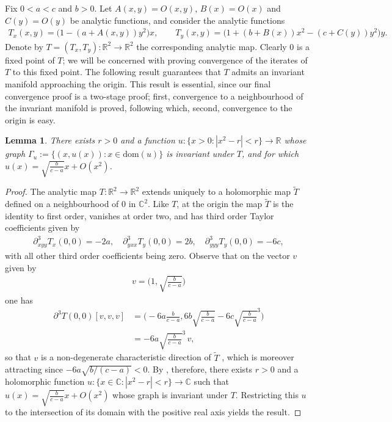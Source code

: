 \documentclass{article}
\newcommand{\RB}{\mathbb{R}}
\newcommand{\CB}{\mathbb{C}}
\theoremstyle{plain}
\newtheorem{lemma}[theorem]{Lemma}
\theoremstyle{definition}
\theoremstyle{remark}
\begin{document}
Fix $0<a<c$ and $b>0$. Let $A(x,y) = O(x,y)$, $B(x) = O(x)$ and $C(y) = O(y)$ be analytic functions, and consider the analytic functions
\begin{align}
    T_x(x,y) = \big(1-(a+A(x,y))y^2\big)x,\qquad T_y(x,y) = \big(1+(b+B(x))x^2-(c+C(y))y^2\big)y. 
\end{align}
Denote by $T = (T_x,T_y):\RB^2\rightarrow\RB^2$ the corresponding analytic map. Clearly $0$ is a fixed point of $T$; we will be concerned with proving convergence of the iterates of $T$ to this fixed point. The following result guarantees that $T$ admits an invariant manifold approaching the origin. This result is essential, since our final convergence proof is a two-stage proof; first, convergence to a neighbourhood of the invariant manifold is proved, following which, second, convergence to the origin is easy.

\begin{lemma}\label{lem:invariant}
    There exists $r>0$ and a function $u:\{x>0:|x^2-r|<r\}\rightarrow\RB$ whose graph $\Gamma_u:=\{(x,u(x)):x\in\text{dom}(u)\}$ is invariant under $T$, and for which $u(x) = \sqrt{\frac{b}{c-a}}x+O(x^2)$.
\end{lemma}

\begin{proof}
    The analytic map $T:\RB^2\rightarrow\RB^2$ extends uniquely to a holomorphic map $\tilde{T}$ defined on a neighbourhood of $0$ in $\CB^2$. Like $T$, at the origin the map $\tilde{T}$ is the identity to first order, vanishes at order two, and has third order Taylor coefficients given by
    \begin{align}
        \partial_{xyy}^3T_x(0,0) = -2a,\quad \partial^3_{yxx}T_y(0,0) = 2b,\quad \partial^3_{yyy}T_y(0,0) = -6c,
    \end{align}
    with all other third order coefficients being zero. Observe that on the vector $v$ given by
    \begin{align}
        v =\bigg(1,\sqrt{\frac{b}{c-a}}\bigg)
    \end{align}
    one has
    \begin{align}
        \partial^3T(0,0)[v,v,v] &= \bigg(-6a\frac{b}{c-a}, 6b\sqrt{\frac{b}{c-a}}-6c\sqrt{\frac{b}{c-a}}^3\bigg)\\&=-6a\sqrt{\frac{b}{c-a}}^3\,v,
    \end{align}
    so that $v$ is a non-degenerate characteristic direction of $\tilde{T}$ \cite[Definition 4.1]{hakimhigher}, which is moreover attracting since $-6a\sqrt{b/(c-a)}<0$. By \cite[Section 6]{hakimhigher}, therefore, there exists $r>0$ and a holomorphic function $u:\{x\in\CB:|x^2-r|<r\}\rightarrow\CB$ such that $u(x) = \sqrt{\frac{b}{c-a}}x+O(x^2)$ whose graph is invariant under $T$. Restricting this $u$ to the intersection of its domain with the positive real axis yields the result.
\end{proof}
\end{document}
